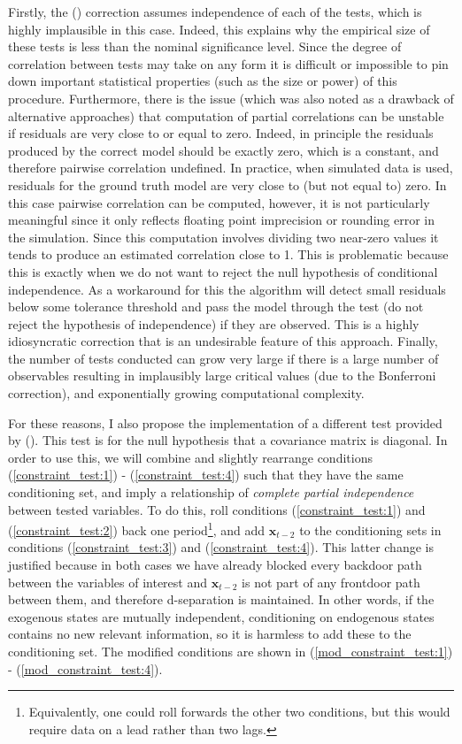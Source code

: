 \documentclass{article}
\begin{document}
Firstly, the \citeauthor{bonferroni1936teoria} (\citeyear{bonferroni1936teoria}) correction assumes independence of each of the tests, which is highly implausible in this case. Indeed, this explains why the empirical size of these tests is less than the nominal significance level. Since the degree of correlation between tests may take on any form it is difficult or impossible to pin down important statistical properties (such as the size or power) of this procedure. Furthermore, there is the issue (which was also noted as a drawback of alternative approaches) that computation of partial correlations can be unstable if residuals are very close to or equal to zero. Indeed, in principle the residuals produced by the correct model should be exactly zero, which is a constant, and therefore pairwise correlation undefined. In practice, when simulated data is used, residuals for the ground truth model are very close to (but not equal to) zero. In this case pairwise correlation can be computed, however, it is not particularly meaningful since it only reflects floating point imprecision or rounding error in the simulation. Since this computation involves dividing two near-zero values it tends to produce an estimated correlation close to 1. This is problematic because this is exactly when we do not want to reject the null hypothesis of conditional independence. As a workaround for this the algorithm will detect small residuals below some tolerance threshold and pass the model through the test (do not reject the hypothesis of independence) if they are observed. This is a highly idiosyncratic correction that is an undesirable feature of this approach. Finally, the number of tests conducted can grow very large if there is a large number of observables resulting in implausibly large critical values (due to the Bonferroni correction), and exponentially growing computational complexity.

For these reasons, I also propose the implementation of a different test provided by \citeauthor{srivastava2005some} (\citeyear{srivastava2005some}). This test is for the null hypothesis that a covariance matrix is diagonal. In order to use this, we will combine and slightly rearrange conditions (\ref{constraint_test:1}) - (\ref{constraint_test:4}) such that they have the same conditioning set, and imply a relationship of \textit{complete partial independence} between tested variables. To do this, roll conditions (\ref{constraint_test:1}) and (\ref{constraint_test:2}) back one period\footnote{Equivalently, one could roll forwards the other two conditions, but this would require data on a lead rather than two lags.}, and add $\mathbf{x}_{t-2}$ to the conditioning sets in conditions (\ref{constraint_test:3}) and (\ref{constraint_test:4}). This latter change is justified because in both cases we have already blocked every backdoor path between the variables of interest and $\mathbf{x}_{t-2}$ is not part of any frontdoor path between them, and therefore d-separation is maintained. In other words, if the exogenous states are mutually independent, conditioning on endogenous states contains no new relevant information, so it is harmless to add these to the conditioning set. The modified conditions are shown in (\ref{mod_constraint_test:1}) - (\ref{mod_constraint_test:4}).
\end{document}

